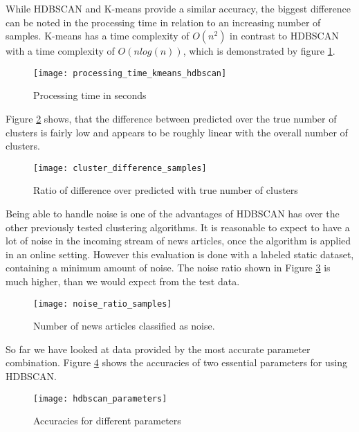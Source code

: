 While HDBSCAN and K-means provide a similar accuracy, the biggest difference can be noted in the processing time in relation to an increasing number of samples. K-means has a time complexity of $O(n^2)$ in contrast to HDBSCAN with a time complexity of $O(nlog(n))$, which is demonstrated by figure \ref{fig:processing_time_kmeans_hdbscan}.

\begin{figure}[h]
    \centering
    \texttt{[image: processing\_time\_kmeans\_hdbscan]}
    \caption{Processing time in seconds }
    \label{fig:processing_time_kmeans_hdbscan}
\end{figure}

Figure \ref{fig:cluster_difference_samples} shows, that the difference between predicted over the true number of clusters is fairly low and appears to be roughly linear with the overall number of clusters.  

\begin{figure}[h]
    \centering
    \texttt{[image: cluster\_difference\_samples]}
    \caption{Ratio of difference over predicted with true number of clusters}
    \label{fig:cluster_difference_samples}
\end{figure}

Being able to handle noise is one of the advantages of HDBSCAN has over the other previously tested clustering algorithms. It is reasonable to expect to have a lot of noise in the incoming stream of news articles, once the algorithm is applied in an online setting. However this evaluation is done with a labeled static dataset, containing a minimum amount of noise. The noise ratio shown in Figure \ref{fig:noise_ratio_samples} is much higher, than we would expect from the test data. 

\begin{figure}[h]
    \centering
    \texttt{[image: noise\_ratio\_samples]}
    \caption{Number of news articles classified as noise.}
    \label{fig:noise_ratio_samples}
\end{figure}



So far we have looked at data provided by the most accurate parameter combination. Figure \ref{fig:hdbscan_parameters} shows the accuracies of two essential parameters for using HDBSCAN. 

\begin{figure}[h]
    \centering
    \texttt{[image: hdbscan\_parameters]}
    \caption{Accuracies for different parameters}
    \label{fig:hdbscan_parameters}
\end{figure}
